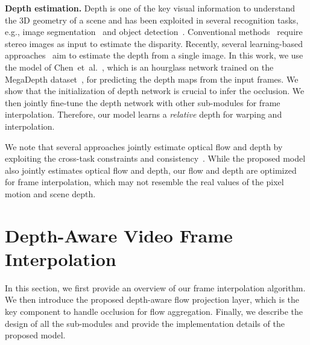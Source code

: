 \documentclass[10pt,twocolumn,letterpaper]{article}
\newcommand{\Paragraph}[1]{{\vspace{-2mm}\flushleft\textbf{#1}}} \newcommand{\ul}[1]{\underline{\smash{#1}}}
\def\etal{et~al.\xspace}
\begin{document}
	\Paragraph{Depth estimation.}
Depth is one of the key visual information to understand the 3D geometry of a scene and has been exploited in several recognition tasks, e.g., image segmentation~\cite{zhang2010semantic} and object detection~\cite{sun2010depth}.
Conventional methods~\cite{ha2016high, karsch2014depth, rajagopalan2004depth} require stereo images as input to estimate the disparity.
Recently, several learning-based approaches~\cite{eigen2015predicting, eigen2014depth, fu2018deep, kuznietsov2017semi, liu2016learning, roy2016monocular, saxena2006learning, wang2015towards} aim to estimate the depth from a single image.
In this work, we use the model of Chen~\etal~\cite{chen2016single}, which is an hourglass network trained on the MegaDepth dataset~\cite{li2018megadepth}, for predicting the depth maps from the input frames.
We show that the initialization of depth network is crucial to infer the occlusion.
We then jointly fine-tune the depth network with other sub-modules for frame interpolation.
Therefore, our model learns a \emph{relative} depth for warping and interpolation.


	
	
	
	We note that several approaches jointly estimate optical flow and depth by exploiting the cross-task constraints and consistency~\cite{yin2018geonet, zhou2017unsupervised, zou2018df}.
While the proposed model also jointly estimates optical flow and depth, our flow and depth are optimized for frame interpolation, which may not resemble the real values of the pixel motion and scene depth.
	
	
	
	
	\section{Depth-Aware Video Frame Interpolation}
In this section, we first provide an overview of our frame interpolation algorithm.
We then introduce the proposed depth-aware flow projection layer, which is the key component to handle occlusion for flow aggregation.
Finally, we describe the design of all the sub-modules and provide the implementation details of the proposed model.
	
	
	
\end{document}
